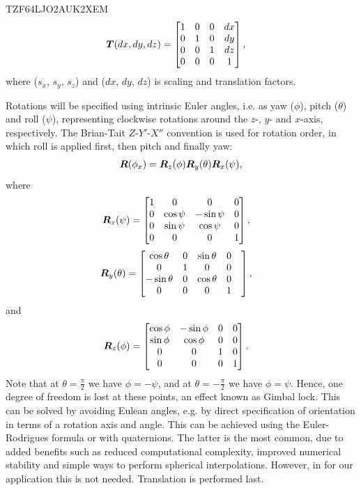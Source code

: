 TZF64LJO2AUK2XEM
%
\begin{align}
\boldsymbol{T}(dx,dy,dz) &= \begin{bmatrix}
	1  &  0  &  0  &  dx \\
	0  &  1  &  0  &  dy \\
	0  &  0  &  1  &  dz \\
	0  &  0  &  0  &  1 \\
\end{bmatrix},
\end{align}
%
where ($s_x$, $s_y$, $s_z$) and ($dx$, $dy$, $dz$) is scaling and translation factors.

Rotations will be specified using intrinsic Euler angles, i.e. as yaw ($\phi$), pitch ($\theta$) and roll ($\psi$), representing clockwise rotations around the $z$-, $y$- and $x$-axis, respectively. The Brian-Tait $Z$-$Y'$-$X''$ convention is used for rotation order, in which roll is applied first, then pitch and finally yaw:
%
\begin{align}
\boldsymbol{R}(\phi_x) = \boldsymbol{R}_z(\phi)\boldsymbol{R}_y(\theta)\boldsymbol{R}_x(\psi),
\end{align}
%
where
%
\begin{align}
\boldsymbol{R}_x(\psi) &= \begin{bmatrix}
1  &  0           &  0           &  0 \\
0  &  \cos\psi  &  -\sin\psi &  0 \\
0  &  \sin\psi  &  \cos\psi  &  0 \\
0  &  0           &  0           &  1 \\
\end{bmatrix},
\end{align}
%
\begin{align}
\boldsymbol{R}_y(\theta) & = \begin{bmatrix}
\cos\theta	& 0          & \sin\theta & 0 \\
0					& 1                   & 0          & 0          &  \\
-\sin\theta  & 0                   & \cos\theta & 0          &  \\
0            & 0                   & 0          & 1          &  \\
\end{bmatrix},           &
\end{align}
%
and
%
\begin{align}
\boldsymbol{R}_z(\phi) &= \begin{bmatrix}
\cos\phi  &  -\sin\phi &  0  &  0 \\
\sin\phi  &  \cos\phi  &  0  &  0 \\
0				&  0           &  1  &  0 \\
0           &  0           &  0  &  1 \\
\end{bmatrix}.
\end{align}
%
Note that at $\theta=\frac{\pi}{2}$ we have $\phi=-\psi$, and at $\theta=-\frac{\pi}{2}$ we have $\phi=\psi$. Hence, one degree of freedom is lost at these points, an effect known as Gimbal lock. This can be solved by avoiding Eulean angles, e.g. by direct specification of orientation in terms of a rotation axis and angle. This can be achieved using the Euler-Rodrigues formula or with quaternions. The latter is the most common, due to added benefits such as reduced computational complexity, improved numerical stability and simple ways to perform spherical interpolations. However, in for our application this is not needed.
%
Translation is performed last. 
%




